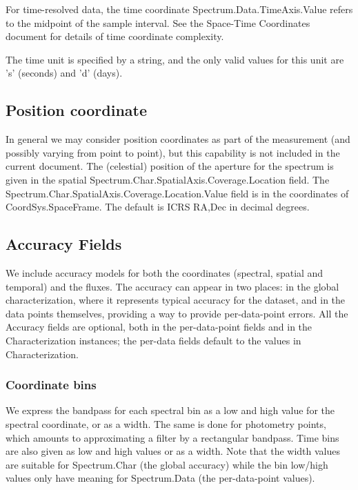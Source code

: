 \documentclass[11pt]{article}
\begin{document}
For time-resolved data, the time coordinate 
Spectrum.Data.TimeAxis.Value
refers to the
midpoint of the sample interval. See the Space-Time Coordinates document
for details of time coordinate complexity.
  
The time unit is specified by a string, and the only valid values for this unit
are 's' (seconds) and 'd' (days).

\subsection{Position coordinate}

In general we may consider position coordinates as part of the
measurement (and possibly varying from point to point), but this capability is not
included in the current document. The (celestial) position of the aperture
for the spectrum is given in the spatial
Spectrum.Char.SpatialAxis.Coverage.Location field. The 
Spectrum.Char.SpatialAxis.Coverage.Location.Value field
is in the coordinates of CoordSys.SpaceFrame. The default is ICRS
RA,Dec in decimal degrees.


\subsection{Accuracy Fields}

We include accuracy models for both the coordinates (spectral, spatial
and temporal) and the fluxes.  The accuracy can appear in two places:
in the global characterization, where it represents typical accuracy
for the dataset, and in the data points themselves, providing a 
way to provide per-data-point errors.
All the Accuracy fields are optional, both in the per-data-point fields and
in the Characterization instances; the per-data fields default to
the values in Characterization.


    
\subsubsection{Coordinate bins}

We express the bandpass for each spectral bin as a low and high value
for the spectral coordinate, or as a width.
The same is done for photometry points, which
amounts to approximating a filter by a rectangular bandpass.
Time bins are also given as low and high values or as a width.
Note that the width values are suitable for Spectrum.Char (the global accuracy)
while the bin low/high values only have meaning for Spectrum.Data (the per-data-point
values).
\end{document}

